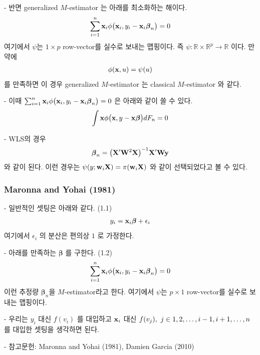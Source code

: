 \documentclass[preprint, review, 12pt]{article}
\theoremstyle{definition}
\theoremstyle{remark}
\begin{document}
- 반면 generalized $M$-estimator 는 아래를 최소화하는 해이다. 
\begin{align}
\sum_{i=1}^{n}{\bf x}_ i \phi\big({\bf x}_ i , y_i-{\bf x}_ i \boldsymbol{\beta}_ n\big) =0 
\end{align}
여기에서 $\psi$는 $1\times p$ row-vector를 실수로 보내는 맵핑이다. 즉 $\psi:\mathbb{R}\times \mathbb{R}^p \to \mathbb{R}$ 이다. 만약에 
\begin{align}
\phi({\bf x},u)=\psi(u)
\end{align}
를 만족하면 이 경우 generalized $M$-estimator 는 classical $M$-estimator 와 같다. 

- 이때 $\sum_{i=1}^{n}{\bf x}_ i \phi\big({\bf x}_ i , y_i-{\bf x}_ i \boldsymbol{\beta}_ n\big) =0$ 은 아래와 같이 쓸 수 있다. 
\begin{align}
\int {\bf x} \phi\big({\bf x} , y-{\bf x} \boldsymbol{\beta}\big) dF_n=0 
\end{align}

- WLS의 경우 
\begin{align}
\boldsymbol{\beta}_ n = \big({\bf X}'{\bf W}^2{\bf X}\big)^{-1}{\bf X}'{\bf W}{\bf y}
\end{align}
와 같이 된다. 이런 경우는 $\psi(y;{\bf w}_ i {\bf X})= \pi({\bf w}_ i {\bf X}) $ 와 같이 선택되었다고 볼 수 있다. 

\subsubsection*{Maronna and Yohai (1981)}

- 일반적인 셋팅은 아래와 같다. (1.1) 
\begin{align}
y_i={\bf x}_ i \boldsymbol{\beta}  +\epsilon_i 
\end{align}
여기에서 $\epsilon_i$ 의 분산은 편의상 $1$ 로 가정한다. 

- 아래를 만족하는 $\boldsymbol{\beta}$ 를 구한다. (1.2) 
\begin{align}
\sum_{i=1}^{n}{\bf x}_ i \phi\big({\bf x}_ i , y_i-{\bf x}_ i \boldsymbol{\beta}_ n\big) =0 
\end{align}
이런 추정량 $\boldsymbol{\beta}_ n$을 $M$-estimator라고 한다. 여기에서 $\psi$는 $p\times 1$ row-vector를 실수로 보내는 맵핑이다. 

- 우리는 $y_i$ 대신 $f(v_i)$ 를 대입하고 ${\bf x}_ i$ 대신 $f(v_j),~ j\in\\{1,2,\dots,i-1,i+1,\dots,n\\}$ 를 대입한 셋팅을 생각하면 된다. 

- 참고문헌: Maronna and Yohai (1981), Damien Garcia (2010) 
\end{document}

